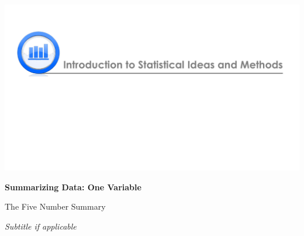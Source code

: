\documentclass[12pt, fleqn]{article}
\begin{document}
\hspace{1cm} \\
\vspace{-3.5cm} 

\centerline{\includegraphics[width=1.1\textwidth]{headerfinal.pdf}}

\vspace{.5cm}

\centerline{{\Large{ \textbf{Summarizing Data: One Variable }}}}  %
\vspace{.2cm}
\centerline{{\large{The Five Number Summary}}} \normalsize  \vspace{.2cm} %
\centerline{{\textit{Subtitle if applicable }}} \normalsize %
\end{document}
